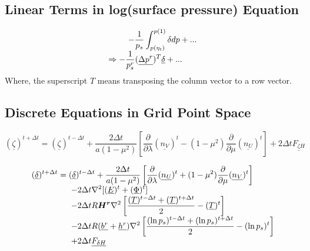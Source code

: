 \documentclass[12pt,a4paper]{book}
\begin{document}
\subsection{Linear Terms in log(surface pressure) Equation}

	\begin{equation}
	\begin{array}{l}
	\displaystyle 
	\hspace{2 pc} -\frac{1}{p_s} \int_{p(\eta_t)}^{p(1)} \delta dp + ... \\
	\displaystyle 
	\Rightarrow -\frac{1}{p^r_s} (\underline{\Delta p^r} )^T \underline{\delta} + ... \\
	\end{array} 
	\end{equation}
Where, the superscript $T$ means transposing the column vector to a row vector.


\subsection{Discrete Equations in Grid Point Space}

	\begin{equation}
	(\underline{\zeta})^{t+\Delta t} = (\underline{\zeta})^{t-\Delta t} 
	+ \frac{2\Delta t }{a(1-\mu^2)} \left[ \frac{\partial}{\partial \lambda} (\underline{n_V})^t 
	- (1-\mu^2) \frac{\partial}{\partial \mu} (\underline{n_U})^t \right]
	+ 2\Delta t \underline{F_{\zeta H}} 
	\end{equation}

	\begin{equation}
	\begin{array}{l}
	\displaystyle 
	(\underline{\delta})^{t+\Delta t} = (\underline{\delta})^{t-\Delta t} 
	+ \frac{2\Delta t }{a(1-\mu^2)} \left[ \frac{\partial}{\partial \lambda} (\underline{n_U})^t 
	+ (1-\mu^2) \frac{\partial}{\partial \mu} (\underline{n_V})^t \right] \\
	\displaystyle 
	\hspace{4 pc} - 2\Delta t \nabla^2 [ (\underline{E})^t +  (\underline{\Phi})^t] \\
	\displaystyle 
	\hspace{4 pc} - 2\Delta t R \boldsymbol{H^r} \nabla^2 \left[\frac{(\underline{T})^{t-\Delta t} + (\underline{T})^{t+\Delta t}}{2}  - (\underline{T})^t \right] \\
	\displaystyle 
	\hspace{4 pc} - 2\Delta t R (\underline{b^r} + \underline{h^r}) \nabla^2 \left[ \frac{(\ln p_s)^{t-\Delta t} + (\ln p_s)^{t+\Delta t}}{2} - (\ln p_s)^t \right] \\	

	\hspace{4 pc} + 2\Delta t \underline{F_{\delta H}} 
	\end{array} 
	\end{equation}
\end{document}
